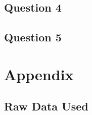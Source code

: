 \documentclass{article}
\begin{document}
\subsection*{Question 4}

\subsection*{Question 5}

\newpage
\section*{Appendix}
\subsection*{Raw Data Used}
\end{document}
